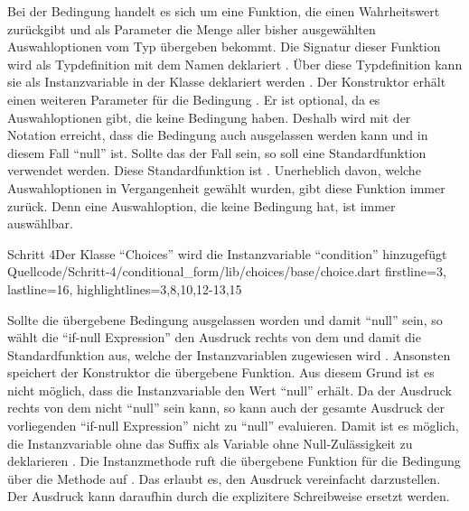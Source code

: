 Bei der Bedingung handelt es sich um eine Funktion,
die einen Wahrheitswert  zurückgibt und als Parameter die Menge aller bisher ausgewählten Auswahloptionen vom Typ  übergeben bekommt.
Die Signatur dieser Funktion wird als Typdefinition mit dem Namen  deklariert .
Über diese Typdefinition kann sie als Instanzvariable in der Klasse  deklariert werden .
Der Konstruktor erhält einen weiteren Parameter für die Bedingung .
Er ist optional,
da es Auswahloptionen gibt,
die keine Bedingung haben.
Deshalb wird mit der Notation  erreicht,
dass die Bedingung auch ausgelassen werden kann und in diesem Fall \enquote{null} ist.
Sollte das der Fall sein,
so soll eine Standardfunktion verwendet werden.
Diese Standardfunktion ist  .
Unerheblich davon,
 welche Auswahloptionen in Vergangenheit gewählt wurden,
gibt diese Funktion immer  zurück.
Denn eine Auswahloption,
die keine Bedingung hat,
ist immer auswählbar.
\begin{alexlisting}{Schritt 4}{Der Klasse \enquote{Choices} wird die Instanzvariable \enquote{condition} hinzugefügt}
  {Quellcode/Schritt-4/conditional_form/lib/choices/base/choice.dart}
  {firstline=3, lastline=16, highlightlines={3,8,10,12-13,15 }}
  \label{lst:Schritt4Choice}
\end{alexlisting}


Sollte die übergebene Bedingung ausgelassen worden und damit \enquote{null} sein,
so wählt die \enquote{if-null Expression} den Ausdruck rechts von dem  und damit die Standardfunktion  aus,
welche der Instanzvariablen  zugewiesen wird .
Ansonsten speichert der Konstruktor die übergebene Funktion.
Aus diesem Grund ist es nicht möglich,
dass die Instanzvariable  den Wert \enquote{null} erhält.
Da der Ausdruck rechts von dem  nicht \enquote{null} sein kann,
so kann auch der gesamte Ausdruck der vorliegenden \enquote{if-null Expression} nicht zu \enquote{null} evaluieren.
Damit ist es möglich,
die Instanzvariable  ohne das Suffix  als Variable ohne Null-Zulässigkeit zu deklarieren .
Die Instanzmethode  ruft die übergebene Funktion für die Bedingung über die Methode  auf .
Das erlaubt es, den Ausdruck vereinfacht darzustellen.
Der Ausdruck  kann daraufhin durch die explizitere Schreibweise  ersetzt werden.



